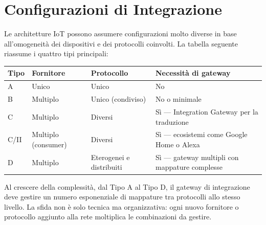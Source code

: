 \documentclass[
  italian,
  openany]{book}
\newcounter{none} %
\begin{document}
\section{Configurazioni di
Integrazione}\label{configurazioni-di-integrazione}

Le architetture IoT possono assumere configurazioni molto diverse in
base all'omogeneità dei dispositivi e dei protocolli coinvolti. La
tabella seguente riassume i quattro tipi principali:

{\def\LTcaptype{none} %
\begin{longtable}[]{@{}
  >{\raggedright\arraybackslash}p{}
  >{\raggedright\arraybackslash}p{}
  >{\raggedright\arraybackslash}p{}
  >{\raggedright\arraybackslash}p{}@{}}
\toprule\noalign{}
\begin{minipage}[b]{\linewidth}\raggedright
Tipo
\end{minipage} & \begin{minipage}[b]{\linewidth}\raggedright
Fornitore
\end{minipage} & \begin{minipage}[b]{\linewidth}\raggedright
Protocollo
\end{minipage} & \begin{minipage}[b]{\linewidth}\raggedright
Necessità di gateway
\end{minipage} \\
\midrule\noalign{}
\endhead
\bottomrule\noalign{}
\endlastfoot
A & Unico & Unico & No \\
B & Multiplo & Unico (condiviso) & No o minimale \\
C & Multiplo & Diversi & Sì --- Integration Gateway per la traduzione \\
C/II & Multiplo (consumer) & Diversi & Sì --- ecosistemi come Google
Home o Alexa \\
D & Multiplo & Eterogenei e distribuiti & Sì --- gateway multipli con
mappature complesse \\
\end{longtable}
}

Al crescere della complessità, dal Tipo A al Tipo D, il gateway di
integrazione deve gestire un numero esponenziale di mappature tra
protocolli allo stesso livello. La sfida non è solo tecnica ma
organizzativa: ogni nuovo fornitore o protocollo aggiunto alla rete
moltiplica le combinazioni da gestire.
\end{document}
